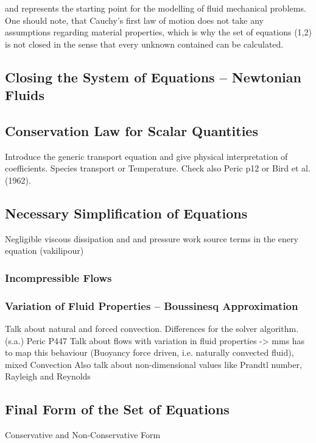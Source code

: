     and represents the starting point for the modelling of fluid mechanical problems. One should note, that Cauchy's first law of motion does not take any assumptions regarding material properties, which is why the set of equations (1,2) is not closed in the sense that every unknown contained can be calculated.

    \subsection{Closing the System of Equations -- Newtonian Fluids}
    \subsection{Conservation Law for Scalar Quantities}
        Introduce the generic transport equation and give physical interpretation of coefficients. Species transport or Temperature.
        Check also Peric p12 or Bird et al. (1962).
    \subsection{Necessary Simplification of Equations}
        Negligible viscous dissipation and and pressure work source terms in the enery equation (vakilipour)
      \subsubsection{Incompressible Flows}
      \subsubsection{Variation of Fluid Properties -- Boussinesq Approximation}
      Talk about natural and forced convection. Differences for the solver algorithm. (s.a.) Peric P447
      Talk about flows with variation in fluid properties -> mms has to map this behaviour (Buoyancy force driven, i.e. naturally convected fluid), mixed Convection
      Also talk about non-dimensional values like Prandtl number, Rayleigh and Reynolds
    \subsection{Final Form of the Set of Equations}
        Conservative and Non-Conservative Form
